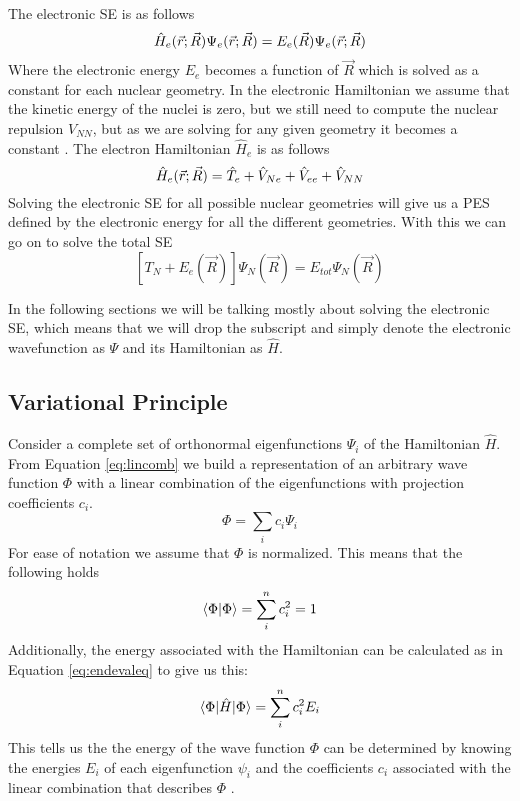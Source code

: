 \documentclass[../master_thesis.tex]{subfiles}
\begin{document}
The electronic \ac{SE} is as follows
\begin{equation}
    \hat{H}_e(\vec{r}; \vec{R}) \Psi_e(\vec{r};\vec{R}) = E_e(\vec{R})\Psi_e(\vec{r};\vec{R})
\end{equation}
Where the electronic energy $E_e$ becomes a function of $\vec{R}$ which is solved as
a constant for each nuclear geometry. In the electronic Hamiltonian
we assume that the kinetic energy of the nuclei is zero, but we still need to
compute the nuclear repulsion $V_{NN}$, but as we are solving for any given geometry
 it becomes a constant \cite{Cramer:2004}. The electron
Hamiltonian $\hat{H}_e$ is as follows
\begin{equation}\label{eq:elhamiltonian}
    \hat{H}_e(\vec{r}; \vec{R}) = \hat{T}_e + \hat{V}_{Ne} + \hat{V}_{ee}  + \hat{V}_{NN}
\end{equation}
Solving the electronic \ac{SE} for all possible nuclear geometries will give us
a \ac{PES} defined by the electronic energy for all the different geometries.
With this we can go on to solve the total \ac{SE} \cite{Jensen:2017}
\begin{equation}
  \left[T_N + E_e(\vec{R})\right]\Psi_N(\vec{R}) = E_{tot}\Psi_N(\vec{R})
\end{equation}

In the following sections we will be talking mostly about solving the electronic \ac{SE},
 which means that we will drop the subscript and simply denote the electronic
wavefunction as $\Psi$ and its Hamiltonian as $\hat{H}$.

\subsection{Variational Principle}
Consider a complete set of orthonormal eigenfunctions $ \Psi_i$  of the
Hamiltonian $\hat{H}$. From Equation \ref{eq:lincomb} we build a representation of an
arbitrary wave function $\Phi$ with a linear combination of the eigenfunctions with
projection coefficients $c_i$.
\begin{equation}
  \Phi = \sum\limits_ic_i\Psi_i
\end{equation}
For ease of notation we assume that  $\Phi$ is normalized. This means that the
following holds
\begin{equation}
  \braket{\Phi|\Phi} = \sum\limits_i^nc_i^2 = 1
\end{equation}
 Additionally, the energy associated with the Hamiltonian can
be calculated as in Equation \ref{eq:endevaleq} to give us this:
\begin{equation}
  \braket{\Phi|\hat{H}|\Phi} = \sum\limits_i^nc_i^2E_i\label{eq:genenerg}
\end{equation}
This tells us the the energy of the wave function $\Phi$ can be determined by
knowing the energies $E_i$ of each eigenfunction $\psi_i$ and the coefficients
$c_i$ associated with the linear combination that describes $\Phi$
\cite{Cramer:2004}.
\end{document}
